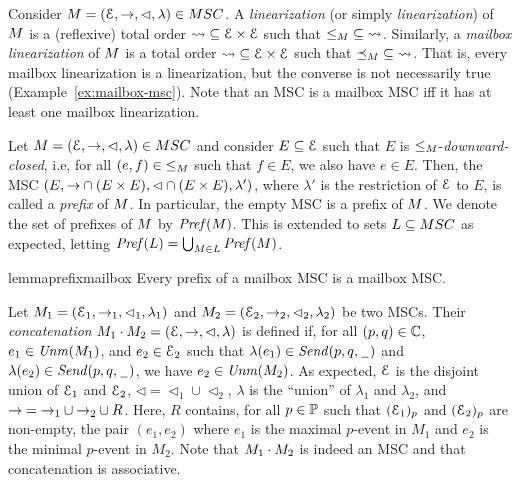 \documentclass[a4paper,UKenglish,cleveref, autoref, thm-restate]{lipics-v2021}
\begin{document}
Consider $\msc = (\Events,\procrel,\lhd,\lambda) \in \MSCs$.
A \emph{\pp linearization} (or simply \emph{linearization}) of $M$ is a (reflexive) total order
${\rightsquigarrow} \subseteq \mathcal{E} \times \mathcal{E}$ such that ${\le_M} \subseteq
{\rightsquigarrow}$. Similarly,
a \emph{mailbox linearization} of $M$ is a total order
${\rightsquigarrow} \subseteq \mathcal{E} \times \mathcal{E}$ such that ${\preceq_M} \subseteq
{\rightsquigarrow}$. That is, every mailbox linearization is a \pp linearization,
but the converse is not necessarily true (Example~\ref{ex:mailbox-msc}).
Note that an MSC is a mailbox MSC iff it has at least one mailbox linearization.

\medskip

Let $\msc = (\Events,\procrel,\lhd,\lambda) \in \MSCs$ and consider
$E \subseteq \mathcal{E}$ such that $E$ is ${\le_M}$-\emph{downward-closed}, i.e,
for all $(e,f) \in {\le_M}$ such that $f \in E$, we also have $e \in E$.
Then, the MSC $(E,{\to} \cap (E \times E),{\lhd} \cap (E \times E),\lambda')$,
where $\lambda'$ is the restriction of $\mathcal{E}$ to $E$, is called a \emph{prefix}
of $M$. In particular, the empty MSC is a prefix of $M$.
We denote the set of prefixes of $M$ by $\mathit{Pref}(M)$.
This is extended to sets $L \subseteq \MSCs$ as expected, letting
$\mathit{Pref}(L) = \bigcup_{M \in L} \mathit{Pref}(M)$.

\begin{restatable}{lemma}{prefixmailbox}
\label{lem:mb-prefix}
Every prefix of a mailbox MSC is a mailbox MSC.
\end{restatable}

Let $M_1 = (\mathcal{E}_1,\to_1,\lhd_1,\lambda_1)$ and
$M_2 = (\mathcal{E}_2,\to_2,\lhd_2,\lambda_2)$ be two MSCs.
Their \emph{concatenation} $M_1 \cdot M_2 = (\mathcal{E},\to,\lhd,\lambda)$ is defined if, for all $(p,q) \in \mathbb{C}$,
$e_1 \in \mathit{Unm}(M_1)$, and
$e_2 \in \mathcal{E}_2$ such that $\lambda(e_1) \in {\mathit{Send}(p,q,\hspace{0.1em}\underline{\hspace{0.5em}}\hspace{0.1em})}$
and $\lambda(e_2) \in {\mathit{Send}(p,q,\hspace{0.1em}\underline{\hspace{0.5em}}\hspace{0.1em})}$,
we have $e_2 \in \mathit{Unm}(M_2)$.
As expected, $\mathcal{E}$ is the disjoint union of $\mathcal{E}_1$ and $\mathcal{E}_2$,
${\lhd}  = {\lhd_1} \cup {\lhd_2}$, $\lambda$ is the ``union'' of $\lambda_1$
and $\lambda_2$, and ${\to} = {\to_1} \cup {\to_2} \cup R$.
Here, $R$ contains, for all $p \in \mathbb{P}$ such that $(\mathcal{E}_1)_p$ and
$(\mathcal{E}_2)_p$ are non-empty, the pair $(e_1,e_2)$ where $e_1$ is the
maximal $p$-event in $M_1$ and $e_2$ is the minimal $p$-event in $M_2$.
Note that $M_1 \cdot M_2$ is indeed an MSC and that
concatenation is associative.
\end{document}
